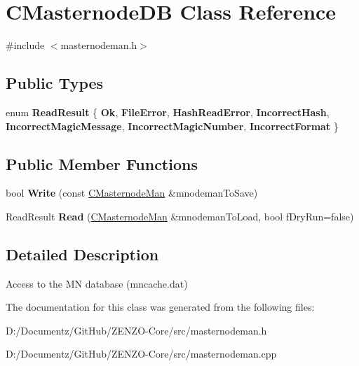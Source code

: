 \hypertarget{class_c_masternode_d_b}{}\section{C\+Masternode\+DB Class Reference}
\label{class_c_masternode_d_b}


{\ttfamily \#include $<$masternodeman.\+h$>$}

\subsection*{Public Types}
\begin{DoxyCompactItemize}
\item 
\mbox{\label{class_c_masternode_d_b_a560dac33848fa407bf7e66f26b08e721}} 
enum {\bfseries Read\+Result} \{ \newline
{\bfseries Ok}, 
{\bfseries File\+Error}, 
{\bfseries Hash\+Read\+Error}, 
{\bfseries Incorrect\+Hash}, 
\newline
{\bfseries Incorrect\+Magic\+Message}, 
{\bfseries Incorrect\+Magic\+Number}, 
{\bfseries Incorrect\+Format}
 \}
\end{DoxyCompactItemize}
\subsection*{Public Member Functions}
\begin{DoxyCompactItemize}
\item 
\mbox{\label{class_c_masternode_d_b_a6833edd9800df785eb6f9c3a1e7d63c4}} 
bool {\bfseries Write} (const \mbox{\hyperlink{class_c_masternode_man}{C\+Masternode\+Man}} \&mnodeman\+To\+Save)
\item 
\mbox{\label{class_c_masternode_d_b_affb4fe075566e13a6aac4f1ba7ee2b95}} 
Read\+Result {\bfseries Read} (\mbox{\hyperlink{class_c_masternode_man}{C\+Masternode\+Man}} \&mnodeman\+To\+Load, bool f\+Dry\+Run=false)
\end{DoxyCompactItemize}


\subsection{Detailed Description}
Access to the MN database (mncache.\+dat) 

The documentation for this class was generated from the following files\+:\begin{DoxyCompactItemize}
\item 
D\+:/\+Documentz/\+Git\+Hub/\+Z\+E\+N\+Z\+O-\/\+Core/src/masternodeman.\+h\item 
D\+:/\+Documentz/\+Git\+Hub/\+Z\+E\+N\+Z\+O-\/\+Core/src/masternodeman.\+cpp\end{DoxyCompactItemize}
